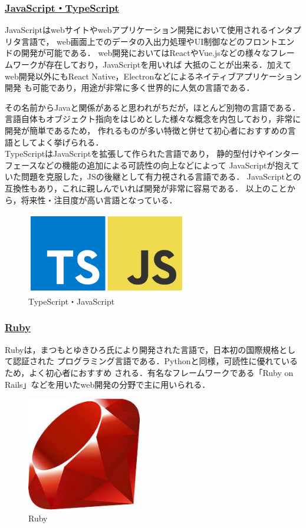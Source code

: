 \documentclass[autodetect-engine,dvi=dvipdfmx,ja=standard,a4j]{bxjsarticle}
\begin{document}
\subsubsection*{\underline{\textbf{JavaScript・TypeScript}}}
JavaScriptはwebサイトやwebアプリケーション開発において使用されるインタプリタ言語で，
web画面上でのデータの入出力処理やUI制御などのフロントエンドの開発が可能である．
web開発においてはReactやVue.jsなどの様々なフレームワークが存在しており，JavaScriptを用いれば
大抵のことが出来る．加えてweb開発以外にもReact Native，Electronなどによるネイティブアプリケーション開発
も可能であり，用途が非常に多く世界的に人気の言語である．

その名前からJavaと関係があると思われがちだが，ほとんど別物の言語である．
言語自体もオブジェクト指向をはじめとした様々な概念を内包しており，非常に開発が簡単であるため，
作れるものが多い特徴と併せて初心者におすすめの言語としてよく挙げられる．\\

TypeScriptはJavaScriptを拡張して作られた言語であり，
静的型付けやインターフェースなどの機能の追加による可読性の向上などによって
JavaScriptが抱えていた問題を克服した，JSの後継として有力視される言語である．
JavaScriptとの互換性もあり，これに親しんでいれば開発が非常に容易である．
以上のことから，将来性・注目度が高い言語となっている．

\begin{figure}[H]
    \centering
    \includegraphics[width=70mm]{image/js-ts.png}
    \caption*{TypeScript・JavaScript}
    \label{fig:js-ts}
\end{figure}

\subsubsection*{\underline{\textbf{Ruby}}}
Rubyは，まつもとゆきひろ氏により開発された言語で，日本初の国際規格として認証された
プログラミング言語である．Pythonと同様，可読性に優れているため，よく初心者におすすめ
される．有名なフレームワークである「Ruby on Rails」などを用いたweb開発の分野で主に用いられる．

\begin{figure}[H]
    \centering
    \includegraphics[width=50mm]{image/Ruby.png}
    \caption*{Ruby}
    \label{fig:ruby}
\end{figure}
\end{document}
